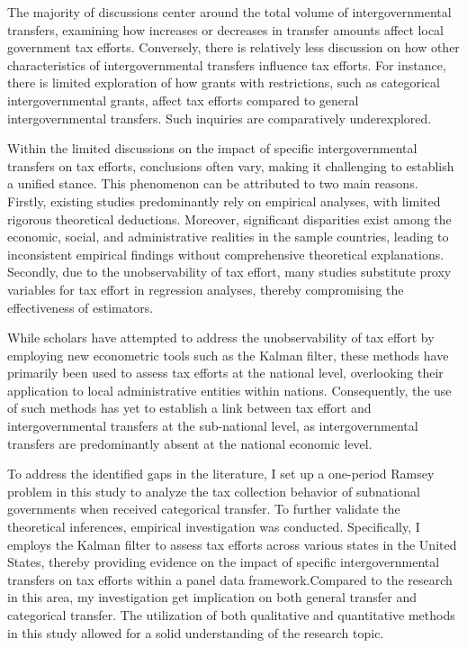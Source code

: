The majority of discussions center around the total volume of intergovernmental transfers, examining how increases or decreases in transfer amounts affect local government tax efforts. Conversely, there is relatively less discussion on how other characteristics of intergovernmental transfers influence tax efforts. For instance, there is limited exploration of how grants with restrictions, such as categorical intergovernmental grants, affect tax efforts compared to general intergovernmental transfers. Such inquiries are comparatively underexplored.

Within the limited discussions on the impact of specific intergovernmental transfers on tax efforts, conclusions often vary, making it challenging to establish a unified stance\parencite{gramlich1997intergovernmental,chubb1985political,nicholson2004goal}. This phenomenon can be attributed to two main reasons. Firstly, existing studies predominantly rely on empirical analyses, with limited rigorous theoretical deductions. Moreover, significant disparities exist among the economic, social, and administrative realities in the sample countries, leading to inconsistent empirical findings without comprehensive theoretical explanations. Secondly, due to the unobservability of tax effort, many studies substitute proxy variables for tax effort in regression analyses, thereby compromising the effectiveness of estimators.

While scholars have attempted to address the unobservability of tax effort by employing new econometric tools such as the Kalman filter, these methods have primarily been used to assess tax efforts at the national level, overlooking their application to local administrative entities within nations. Consequently, the use of such methods has yet to establish a link between tax effort and intergovernmental transfers at the sub-national level, as intergovernmental transfers are predominantly absent at the national economic level.

To address the identified gaps in the literature, I set up a one-period Ramsey problem in this study to analyze the tax collection behavior of subnational governments when received categorical transfer.  To further validate the theoretical inferences, empirical investigation was conducted. Specifically, I employs the Kalman filter to assess tax efforts across various states in the United States, thereby providing evidence on the impact of specific intergovernmental transfers on tax efforts within a panel data framework.Compared to the research in this area, my investigation get implication on both general transfer and categorical transfer. The utilization of both qualitative and quantitative methods in this study allowed for a solid understanding of the research topic.

